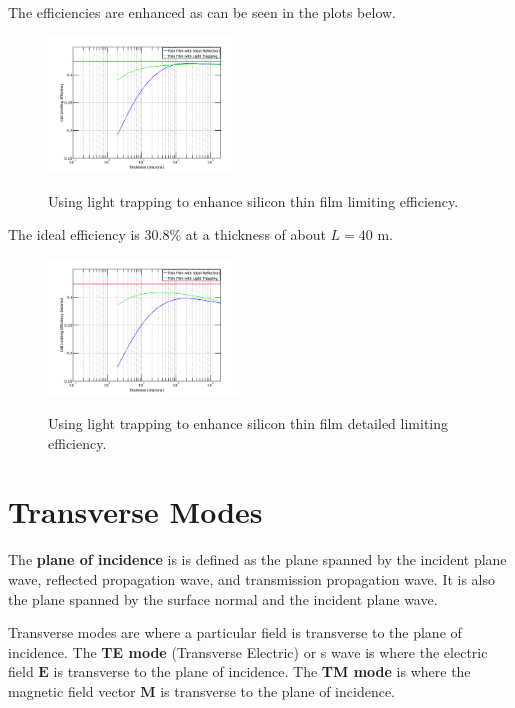 \documentclass[12pt]{article}
\begin{document}
The efficiencies are enhanced as can be seen in the plots below.  
\begin{figure}[H]
\centering
\vspace{-10pt}
{\includegraphics[width=0.45\textwidth]{Figures/LimitingEfficiencyVersusThicknessWLambertian}} 
 \caption[Limiting efficiency with light trapping]{Using light trapping to enhance silicon thin film limiting efficiency.}
  \label{fig:limitingEfficiencyVersusThickness}
\end{figure}

The ideal efficiency is 30.8\% at a thickness of about $L = 40$ \hbox{\textmu}m.
\begin{figure}[H]
\centering
\vspace{-10pt}
{\includegraphics[width=0.45\textwidth]{Figures/LimitingEfficiencyDetailedVersusThicknessWLambertian}} 
 \caption[Detailed limiting efficiency with light trapping]{Using light trapping to enhance silicon thin film detailed limiting efficiency.}
  \label{fig:limitingEfficiencyVersusThickness}
\end{figure} 

\section{Transverse Modes}

The \textbf{plane of incidence} is is defined as the plane spanned by the incident plane wave, reflected propagation wave, and transmission propagation wave.  It is also the plane spanned by the surface normal and the incident plane wave.  

Transverse modes are where a particular field is transverse to the plane of incidence.  
The \textbf{TE mode} (Transverse Electric) or s wave is where the electric field $\textbf{E}$ is transverse to the plane of incidence.  The \textbf{TM mode} is where the magnetic field vector $\textbf{M}$ is transverse to the plane of incidence.  
\end{document}
